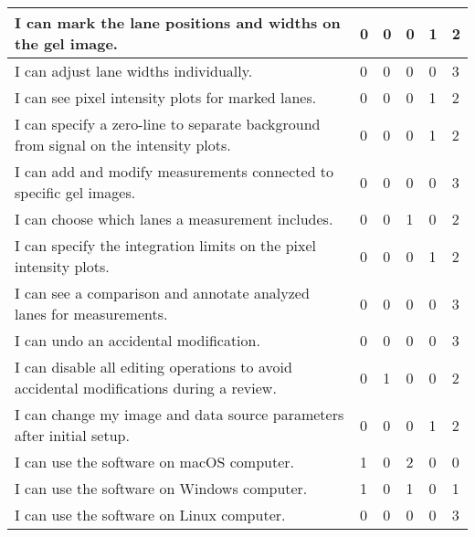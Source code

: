 \begin{longtable}{|p{10cm}|p{}|p{}|p{}|p{}|p{}|}
I can mark the lane positions and widths on the gel image. & 0 & 0 & 0 & 1 & 2 \\ \hline
I can adjust lane widths individually. & 0 & 0 & 0 & 0 & 3 \\ \hline
I can see pixel intensity plots for marked lanes. & 0 & 0 & 0 & 1 & 2 \\ \hline
I can specify a zero-line to separate background from signal on the intensity plots. & 0 & 0 & 0 & 1 & 2 \\ \hline
I can add and modify measurements connected to specific gel images. & 0 & 0 & 0 & 0 & 3 \\ \hline
I can choose which lanes a measurement includes. & 0 & 0 & 1 & 0 & 2 \\ \hline
I can specify the integration limits on the pixel intensity plots. & 0 & 0 & 0 & 1 & 2 \\ \hline
I can see a comparison and annotate analyzed lanes for measurements. & 0 & 0 & 0 & 0 & 3 \\ \hline
I can undo an accidental modification. & 0 & 0 & 0 & 0 & 3 \\ \hline
I can disable all editing operations to avoid accidental modifications during a review. & 0 & 1 & 0 & 0 & 2 \\ \hline
I can change my image and data source parameters after initial setup. & 0 & 0 & 0 & 1 & 2 \\ \hline
I can use the software on macOS computer. & 1 & 0 & 2 & 0 & 0 \\ \hline
I can use the software on Windows computer. & 1 & 0 & 1 & 0 & 1 \\ \hline
I can use the software on Linux computer. & 0 & 0 & 0 & 0 & 3 \\
\end{longtable}
